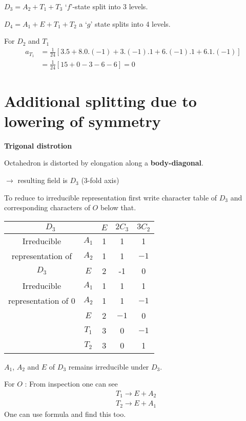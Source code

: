 $D_{3}=A_{2}+T_{1}+T_{3}$ `$f$'-state split into 3 levels.

\smallskip

$D_{4}=A_{1}+E+T_{1}+T_{2}$ a `$g$' state splits into 4 levels.

\begin{example*}
For $D_{2}$  and $T_{1}$
\begin{align*}
a_{T_{1}} &= \frac{1}{24}[3.5+8.0.(-1)+3.(-1).1+6.(-1).1+6.1.(-1)]\\[2pt]
&= \frac{1}{24}[15+0-3-6-6]=0
\end{align*}
\end{example*}

\section*{Additional splitting due to lowering of symmetry}

\textbf{Trigonal distrotion}

Octahedron is distorted by elongation along a {\bf body-diagonal}.

$\to$ resulting field is $D_{3}$ (3-fold axis)

To reduce to irreducible representation first write character table of $D_{3}$ and corresponding characters of $O$ below that.
\begin{center}
\begin{tabular}{cc|ccc}
\hline
\multicolumn{2}{c|}{$D_{3}$} & $E$ & $2C_{3}$ & $3C_{2}$\\[2pt]
\hline
Irreducible & $A_{1}$ & 1 & 1 & 1\\[2pt]
representation of & $A_{2}$ & 1 & 1 & $-1$\\[2pt]
$D_{3}$ & $E$ & 2 & -1 & 0\\[2pt]
Irreducible & $A_{1}$ & 1 & 1 & 1\\[2pt]
representation of $0$ & $A_{2}$ & 1 & 1 & $-1$\\[2pt]
 & $E$ & 2 & $-1$ & 0\\[2pt]
 & $T_{1}$ & 3 & 0 & $-1$\\[2pt]
 & $T_{2}$ & 3 & 0 & 1\\[2pt]
\hline
\end{tabular}
\end{center}
$A_{1}$, $A_{2}$ and $E$ of $D_{3}$ remains irreducible under $D_{3}$.

For $O$ : From inspection one can see
\begin{align*}
& T_{1}\to E+A_{2}\\[2pt]
& T_{2}\to E+A_{1}
\end{align*}
One can use formula and find this too.

